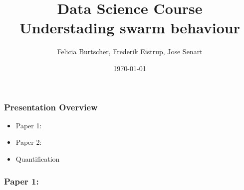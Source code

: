 \documentclass[compress]{beamer}
\title[Short title]{Data Science Course\\
\small{Understading swarm behaviour}}
\author[Grupo B4]{Felicia Burtscher, Frederik Eistrup, Jose Senart\\  %
} %
\date{\today}
\institute[FUB]{\vspace{-10pt}Freie Universität Berlin}
\begin{document}
\begin{frame}
\titlepage
\end{frame}



\begin{frame}
  \frametitle{Presentation Overview}

  \begin{itemize}
	\item Paper 1:
	\item Paper 2:
	\item Quantification
  \end{itemize}


\end{frame}

\begin{frame}
  \frametitle{Paper 1:}
%
%
%
%
\end{frame}
\end{document}

